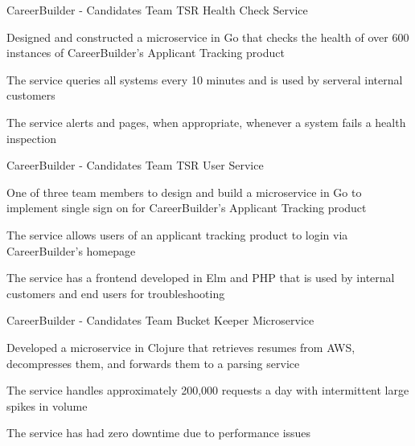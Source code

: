 
\begin{cventries}

\cventry
  	{CareerBuilder - Candidates Team} %
    {TSR Health Check Service} %
    {} %
    {} %
    {
      \begin{cvitems} %
        \item {Designed and constructed a microservice in Go that checks the health of over 600 instances of CareerBuilder's Applicant Tracking product}  
        \item {The service queries all systems every 10 minutes and is used by serveral internal customers}
        \item {The service alerts and pages, when appropriate, whenever a system fails a health inspection} 
      \end{cvitems}
    }


\cventry
  	{CareerBuilder - Candidates Team} %
    {TSR User Service} %
    {} %
    {} %
    {
      \begin{cvitems} %
        \item {One of three team members to design and build a microservice in Go to implement single sign on for CareerBuilder's Applicant Tracking product}  
        \item {The service allows users of an applicant tracking product to login via CareerBuilder's homepage}
        \item {The service has a frontend developed in Elm and PHP that is used by internal customers and end users for troubleshooting} 
      \end{cvitems}
    }

  \cventry
  	{CareerBuilder - Candidates Team} %
    {Bucket Keeper Microservice} %
    {} %
    {} %
    {
      \begin{cvitems} %
        \item {Developed a microservice in Clojure that retrieves resumes from AWS, decompresses them, and forwards them to a parsing service}  
        \item {The service handles approximately 200,000 requests a day with intermittent large spikes in volume}
        \item {The service has had zero downtime due to performance issues} 
      \end{cvitems}
    }


\end{cventries}

